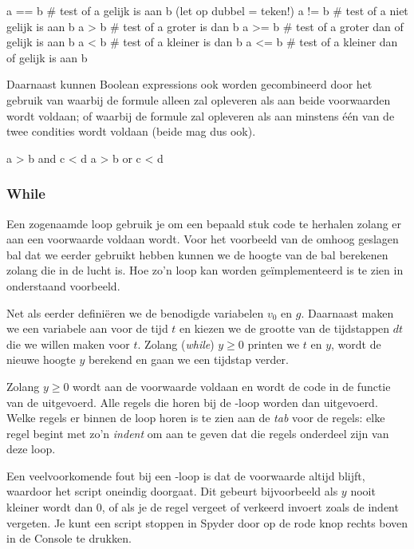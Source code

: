 \documentclass[a4paper,11pt, fleqn]{article}
\begin{document}
\begin{python}
a == b	# test of a gelijk is aan b (let op dubbel = teken!)
a != b	# test of a niet gelijk is aan b
a > b	# test of a groter is dan b
a >= b	# test of a groter dan of gelijk is aan b
a < b	# test of a kleiner is dan b
a <= b	# test of a kleiner dan of gelijk is aan b
\end{python}

Daarnaast kunnen Boolean expressions ook worden gecombineerd door het gebruik van  waarbij de formule alleen   zal opleveren als aan beide voorwaarden wordt voldaan; of  waarbij de formule  zal opleveren als aan minstens \'e\'en van de twee condities wordt voldaan (beide mag dus ook).

\begin{python}
a > b and c < d
a > b or c < d
\end{python}

\subsubsection{While}
Een zogenaamde  loop gebruik je om een bepaald stuk code te herhalen zolang er aan een voorwaarde voldaan wordt. Voor het voorbeeld van de omhoog geslagen bal dat we eerder gebruikt hebben kunnen we de hoogte van de bal berekenen zolang die in de lucht is. Hoe zo'n loop kan worden ge\"implementeerd is te zien in onderstaand voorbeeld.


Net als eerder defini\"eren we de benodigde variabelen $v_0$ en $g$. Daarnaast maken we een variabele aan voor de tijd $t$ en kiezen we de grootte van de tijdstappen $dt$ die we willen maken voor $t$. Zolang (\textit{while}) $y \geq 0$ printen we $t$ en $y$, wordt de nieuwe hoogte $y$ berekend en gaan we een tijdstap verder.

Zolang $y \geq 0$ wordt aan de voorwaarde voldaan en wordt de code in de functie van de  uitgevoerd. Alle regels die horen bij de -loop worden dan uitgevoerd. Welke regels er binnen de loop horen is te zien aan de {\it tab} voor de regels: elke regel begint met zo'n \textit{indent} om aan te geven dat die regels onderdeel zijn van deze loop.

Een veelvoorkomende fout bij een -loop is dat de voorwaarde altijd  blijft, waardoor het script oneindig doorgaat. Dit gebeurt bijvoorbeeld als $y$ nooit kleiner wordt dan 0, of als je de regel  vergeet of verkeerd invoert zoals de indent vergeten. Je kunt een script stoppen in Spyder door op de rode knop rechts boven in de Console te drukken.
\end{document}
